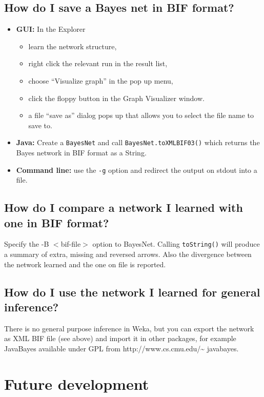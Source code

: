 \documentclass[a4paper]{article}
\begin{document}
\subsection*{How do I save a Bayes net in BIF format?}
\begin{itemize}
\item {\bf GUI:} In the Explorer
\begin{itemize}
\item learn the network structure,
\item right click the relevant run in the result list,
\item choose ``Visualize graph'' in the pop up menu,
\item click the floppy button in the Graph Visualizer window.
\item a file ``save as'' dialog pops up that allows you to select the file name to save to.
\end{itemize}

\item {\bf Java:} Create a {\tt BayesNet} and call {\tt BayesNet.toXMLBIF03()}
which returns the Bayes network in BIF format as a String.

\item {\bf Command line:} use the {\tt -g} option and redirect the output on stdout into a file.
\end{itemize}

\subsection*{How do I compare a network I learned with one in BIF format?}
Specify the -B $<$bif-file$>$ option to BayesNet. 
Calling {\tt toString()} will produce a summary of extra, missing and reversed arrows.
Also the divergence between the network learned and the one on file is reported.

\subsection*{How do I use the network I learned for general inference?}
There is no general purpose inference in Weka, but you can export the
network as XML BIF file (see above) and import it in other packages,
for example JavaBayes available under GPL from
http://www.cs.cmu.edu/\~{} javabayes.


\section{Future development}
\end{document}
